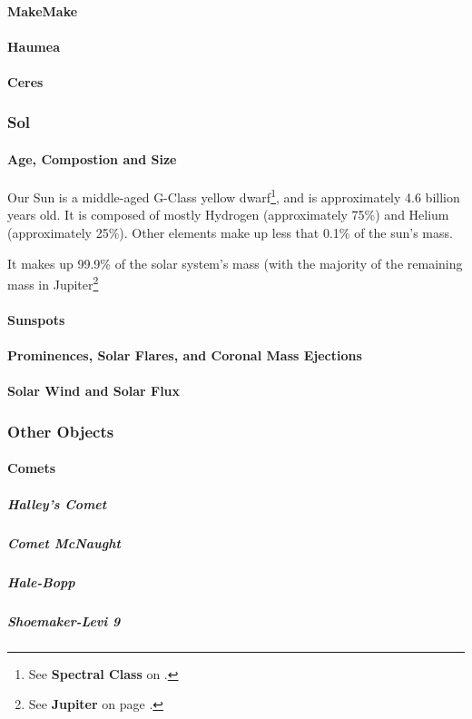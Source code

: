 				\paragraph{MakeMake}
				\paragraph{Haumea}
				\paragraph{Ceres}
				
			\subsubsection{Sol}
				\paragraph{Age, Compostion and Size} 
				Our Sun is a middle-aged G-Class yellow dwarf\footnote{See \textbf{Spectral Class} on .}, and is approximately 4.6 billion years old.  It is composed of mostly Hydrogen (approximately 75\%) and Helium (approximately 25\%).  Other elements make up less that 0.1\% of the sun's mass.  
				
				It makes up 99.9\% of the solar system's mass (with the majority of the remaining mass in Jupiter\footnote{See \textbf{Jupiter} on page .}
				\paragraph{Sunspots}
				\paragraph{Prominences, Solar Flares, and Coronal Mass Ejections}
				\paragraph{Solar Wind and Solar Flux}
				
				
			\subsubsection{Other Objects}
				\paragraph{Comets}
					\subparagraph{Halley's Comet}
					\subparagraph{Comet McNaught}
					\subparagraph{Hale-Bopp}
					\subparagraph{Shoemaker-Levi 9}
